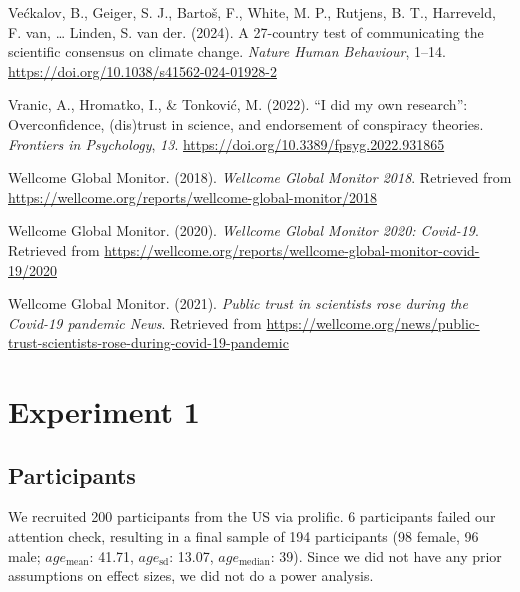 \documentclass[
  doc,floatsintext]{apa6}
\newlength{\cslhangindent}
\newenvironment{CSLReferences}[2] %
 {\begin{list}{}{%
  \setlength{\itemindent}{0pt}
  \setlength{\leftmargin}{0pt}
  \setlength{\parsep}{0pt}
  \ifodd #1
   \setlength{\leftmargin}{\cslhangindent}
   \setlength{\itemindent}{-1\cslhangindent}
  \fi
  \setlength{\itemsep}{#2\baselineskip}}}
 {\end{list}}
\begin{document}
\begin{CSLReferences}{1}{0}
Većkalov, B., Geiger, S. J., Bartoš, F., White, M. P., Rutjens, B. T., Harreveld, F. van, \ldots{} Linden, S. van der. (2024). A 27-country test of communicating the scientific consensus on climate change. \emph{Nature Human Behaviour}, 1--14. \url{https://doi.org/10.1038/s41562-024-01928-2}

Vranic, A., Hromatko, I., \& Tonković, M. (2022). {``}I did my own research{''}: Overconfidence, (dis)trust in science, and endorsement of conspiracy theories. \emph{Frontiers in Psychology}, \emph{13}. \url{https://doi.org/10.3389/fpsyg.2022.931865}

Wellcome Global Monitor. (2018). \emph{Wellcome Global Monitor 2018}. Retrieved from \url{https://wellcome.org/reports/wellcome-global-monitor/2018}

Wellcome Global Monitor. (2020). \emph{Wellcome Global Monitor 2020: Covid-19}. Retrieved from \url{https://wellcome.org/reports/wellcome-global-monitor-covid-19/2020}

Wellcome Global Monitor. (2021). \emph{Public trust in scientists rose during the Covid-19 pandemic \textbar{} News}. Retrieved from \url{https://wellcome.org/news/public-trust-scientists-rose-during-covid-19-pandemic}

\end{CSLReferences}

\newpage

\appendix


\section{Experiment 1}\label{exp1}

\subsection{Participants}\label{participants-1}

We recruited 200 participants from the US via prolific. 6 participants failed our attention check, resulting in a final sample of 194 participants (98 female, 96 male; \(age_\text{mean}\): 41.71, \(age_\text{sd}\): 13.07, \(age_\text{median}\): 39). Since we did not have any prior assumptions on effect sizes, we did not do a power analysis.
\end{document}
